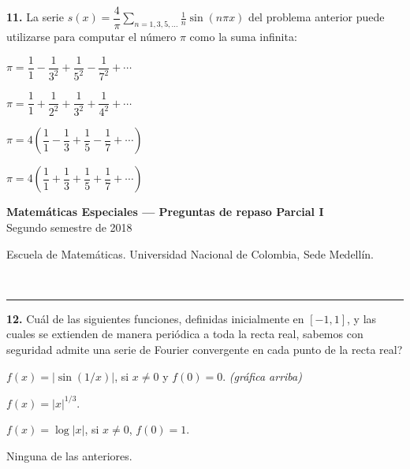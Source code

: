\documentclass[11pt]{article}
\newcommand{\examheader}{%
  \noindent
  \begin{minipage}[t]{0.6\linewidth}
    {\small\bfseries Matem\'aticas Especiales --- Preguntas de repaso Parcial I}\\
    {\small Segundo semestre de 2018}
  \end{minipage}%
  \hfill
  \begin{minipage}[t]{0.35\linewidth}
    \raggedleft\small Escuela de Matem\'aticas. Universidad Nacional de Colombia, Sede Medell\'in.
  \end{minipage}\\[2pt]
  \rule{\linewidth}{0.6pt}
}
\begin{document}
\vspace{6pt}
\textbf{11.} La serie $s(x) = \dfrac{4}{\pi}\displaystyle\sum_{n=1,3,5,\ldots} \frac{1}{n}\sin(n\pi x)$ del problema anterior puede utilizarse para computar el n\'umero $\pi$ como la suma infinita:
\begin{opciones}
  \item $\pi = \dfrac{1}{1} - \dfrac{1}{3^2} + \dfrac{1}{5^2} - \dfrac{1}{7^2} + \cdots$
  \item $\pi = \dfrac{1}{1} + \dfrac{1}{2^2} + \dfrac{1}{3^2} + \dfrac{1}{4^2} + \cdots$
  \item $\pi = 4\left(\dfrac{1}{1} - \dfrac{1}{3} + \dfrac{1}{5} - \dfrac{1}{7} + \cdots\right)$
  \item $\pi = 4\left(\dfrac{1}{1} + \dfrac{1}{3} + \dfrac{1}{5} + \dfrac{1}{7} + \cdots\right)$
\end{opciones}

\clearpage
\examheader
\vspace{4pt}

\textbf{12.} \textquestiondown Cu\'al de las siguientes funciones, definidas inicialmente en $[-1,1]$, y las cuales se extienden de manera peri\'odica a toda la recta real, sabemos con seguridad admite una serie de Fourier convergente en cada punto de la recta real?

\begin{center}
\end{center}

\begin{opciones}
  \item $f(x) = |\sin(1/x)|$, si $x\neq 0$ y $f(0)=0$. \textit{(gr\'afica arriba)}
  \item $f(x) = |x|^{1/3}$.
  \item $f(x) = \log|x|$, si $x\neq 0$, $f(0)=1$.
  \item Ninguna de las anteriores.
\end{opciones}
\end{document}
